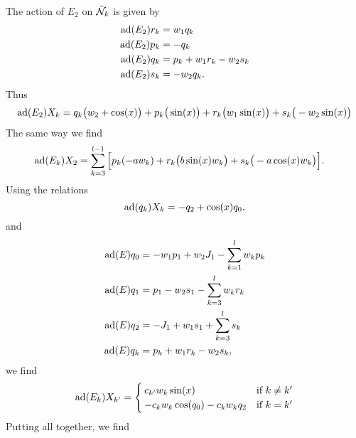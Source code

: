 The action of $E_2$ on $\tilde{\mathcal{N}}_k$ is given by
\begin{subequations}
	\begin{align}
		\operatorname{ad}(E_2)r_k&=w_1q_k\\
		\operatorname{ad}(E_2)p_k&=-q_k\\
		\operatorname{ad}(E_2)q_k&=p_k+w_1r_k-w_2s_k\\
		\operatorname{ad}(E_2)s_k&=-w_2q_k.
	\end{align}
\end{subequations}
Thus 
\begin{equation}\label{LONGadEsurXki}
		\operatorname{ad}(E_2)X_k	=	q_k\big( w_2+\cos(x) \big)
				 + p_k\big( \sin(x) \big)
				 + r_k \big( w_1\sin(x) \big)
				 + s_k \big( -w_2\sin(x) \big)
\end{equation}
The same way we find
\begin{equation}
	\begin{aligned}[]
		\ad(E_k)X_2 = \sum_{k=3}^{l-1}\Big[ & p_k(-aw_k)
						+ r_k\big( b\sin(x)w_k\big)
						+ s_k\big( -a\cos(x)w_k \big)
		\Big].
	\end{aligned}
\end{equation}
Using the relations
\begin{equation}
	\operatorname{ad}(q_k)X_k=-q_2+\cos(x)q_0.
\end{equation}
and
\begin{subequations}
	\begin{align}
		\operatorname{ad}(E)q_0&=-w_1p_1+w_2J_1-\sum_{k=1}^lw_kp_k\\
		\operatorname{ad}(E)q_1&=p_1-w_2s_1-\sum_{k=3}^lw_kr_k\\
		\operatorname{ad}(E)q_2&=-J_1+w_1s_1+\sum_{k=3}^ls_k\\
		\operatorname{ad}(E)q_k&=p_k+w_1r_k-w_2s_k,
	\end{align}
\end{subequations}
we find
\begin{equation}
	\operatorname{ad}(E_k)X_{k'}=\begin{cases}
		c_{k'}w_k\sin(x)	&	\text{if $k\neq k'$}\\
		-c_kw_k\cos(q_0)-c_kw_kq_2	&	 \text{if $k=k'$}
	\end{cases}
\end{equation}
Putting all together, we find
